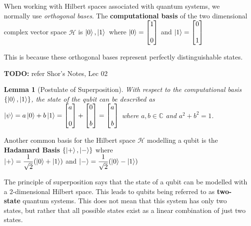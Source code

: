 \documentclass[12pt,twoside]{report}
\newtheorem{lemma}[subsection]{Lemma}
\begin{document}
\vspace*{0.5cm}
When working with Hilbert spaces associated with quantum systems, we normally use \textit{orthogonal bases}. The \textbf{computational basis} of the two dimensional complex vector space $\mathcal{H}$ is $\\{ \ket{0}, \ket{1} \\}$ where $\ket{0} = \begin{bmatrix} 1 \\\\ 0 \end{bmatrix}$ and $\ket{1} = \begin{bmatrix} 0 \\\\ 1 \end{bmatrix}$

This is because these orthogonal bases represent perfectly distinguishable states.

\textbf{TODO:} refer Shor's Notes, Lec 02

\begin{lemma}[Postulate of Superposition]
With respect to the computational basis $\{ \ket{0}, \ket{1} \}$, the state of the qubit can be described as \\ 
    $\ket{\psi} = a \ket{0} + b \ket{1} = \begin{bmatrix} a \\\\ 0 \end{bmatrix} + \begin{bmatrix} 0 \\\\ b \end{bmatrix} = \begin{bmatrix} a \\\\ b \end{bmatrix} $ where $a, b \in \mathbb{C}$ and $a^2 + b^2 = 1$.
\end{lemma}
\vspace*{0.5cm}
Another common basis for the Hilbert space $\mathcal{H}$ modelling a qubit is the \textbf{Hadamard Basis} $\{ \ket{+}, \ket{-} \}$ where \\
$\ket{+} = \displaystyle\frac{1}{\sqrt 2} (\ket{0} + \ket{1})$ and $\ket{-} = \displaystyle\frac{1}{\sqrt 2} (\ket{0} - \ket{1})$

\vspace*{0.5cm}
The principle of superposition says that the state of a qubit can be modelled with a $2$-dimensional Hilbert space. This leads to qubits being referred to as \textbf{two-state} quantum systems. This does not mean that this system has only two states, but rather that all possible states exist as a linear combination of just two states.
\end{document}
